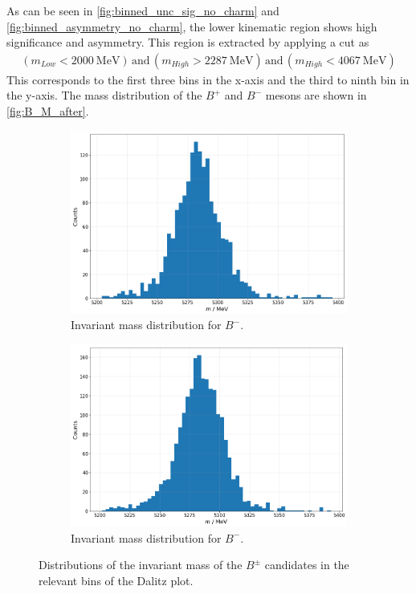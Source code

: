 As can be seen in \autoref{fig:binned_unc_sig_no_charm} and \autoref{fig:binned_asymmetry_no_charm}, the lower kinematic region shows high significance and asymmetry. This region is extracted by applying a cut as 
\begin{align*}
  (m_{Low} < \qty{2000}{\mega\electronvolt}) \, \mathrm{and} \, (m_{High} > \qty{2287}{\mega\electronvolt}) \, \mathrm{and} \, (m_{High} < \qty{4067}{\mega\electronvolt})
\end{align*}
This corresponds to the first three bins in the x-axis and the third to ninth bin in the y-axis. The mass distribution of the $B^+$ and $B^-$ mesons are shown in \autoref{fig:B_M_after}. 
\begin{figure}
  \centering
  \begin{subfigure}[b]{0.45\textwidth}
      \centering
      \includegraphics[width=\textwidth]{"content/pics/B_M_real_after_m.png"}
      \caption{Invariant mass distribution for $B^-$.}
  \end{subfigure}
  \hfill
  \begin{subfigure}[b]{0.45\textwidth}
      \centering
      \includegraphics[width=\textwidth]{"content/pics/B_M_real_after_p.png"}
      \caption{Invariant mass distribution for $B^-$.}
  \end{subfigure}
     \caption{Distributions of the invariant mass of the $B^\pm$ candidates in the relevant bins of the Dalitz plot.}
     \label{fig:B_M_after}
\end{figure}
